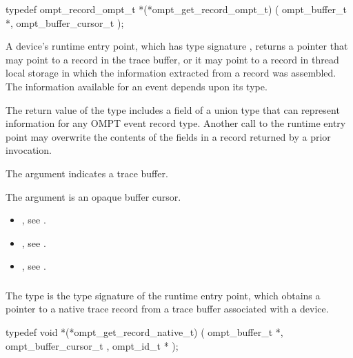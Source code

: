 \format
\begin{ccppspecific}
\begin{omptInquiry}
typedef ompt_record_ompt_t *(*ompt_get_record_ompt_t) (
  ompt_buffer_t *,
  ompt_buffer_cursor_t 
);
\end{omptInquiry}
\end{ccppspecific}

\descr
A device's  runtime entry point, which has
type signature , returns a pointer that may 
point to a record in the trace buffer, or it may point to a record in 
thread local storage in which the information extracted from a record was 
assembled. The information available for an event depends upon its type.

The return value of the  type includes a field 
of a union type that can represent information for any OMPT event record 
type. Another call to the runtime entry point may overwrite the contents 
of the fields in a record returned by a prior invocation.

\argdesc
The  argument indicates a trace buffer.

The  argument is an opaque buffer cursor.

\crossreferences
\begin{itemize}
\item {}, see .

\item {}, see .

\item {}, see .
\end{itemize}



\subsubsection{}
\label{sec:ompt_get_record_native_t}

\summary
The  type is the type signature of the 
 runtime entry point, which obtains a pointer 
to a native trace record from a trace buffer associated with a device.

\format
\begin{ccppspecific}
\begin{omptInquiry}
typedef void *(*ompt_get_record_native_t) (
  ompt_buffer_t *,
  ompt_buffer_cursor_t ,
  ompt_id_t *
);
\end{omptInquiry}
\end{ccppspecific}

